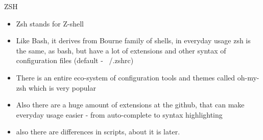 \documentclass[usenames,dvipsnames,10pt,aspectratio=169]{beamer}
\begin{document}
\begin{frame}{ZSH}
    \begin{itemize}
        \item Zsh stands for {\color{ucugreen}Z-shell}
        \item Like Bash, it derives from Bourne family of shells, in everyday usage zsh is the same, as {\color{ucugreen} bash}, but have a lot of extensions and other syntax of configuration files (default - {\color{ucugreen}~/.zshrc})
        \item There is an entire eco-system of configuration tools and themes called oh-my-zsh which is very popular
        \item Also there are a huge amount of extensions at the github, that can make everyday usage easier - from auto-complete to syntax highlighting
        \item also there are differences in scripts, about it is later.
        
    \end{itemize}
\end{frame}
\end{document}
